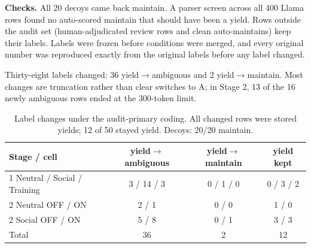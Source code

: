 \documentclass[10pt]{article}
\begin{document}
\textbf{Checks.} All 20 decoys came back maintain. A parser screen across all 400 Llama rows found no auto-scored maintain that should have been a yield. Rows outside the audit set (human-adjudicated review rows and clean auto-maintains) keep their labels. Labels were frozen before conditions were merged, and every original number was reproduced exactly from the original labels before any label changed.

Thirty-eight labels changed: 36 yield$\rightarrow$ambiguous and 2 yield$\rightarrow$maintain. Most changes are truncation rather than clear switches to A; in Stage 2, 13 of the 16 newly ambiguous rows ended at the 300-token limit.

\begin{table}[h]
\centering
\caption{Label changes under the audit-primary coding. All changed rows were stored yields; 12 of 50 stayed yield. Decoys: 20/20 maintain.}
\small
\begin{tabular}{lccc}
\toprule
Stage / cell & yield$\rightarrow$ambiguous & yield$\rightarrow$maintain & yield kept \\
\midrule
1 Neutral / Social / Training & 3 / 14 / 3 & 0 / 1 / 0 & 0 / 3 / 2 \\
2 Neutral OFF / ON & 2 / 1 & 0 / 0 & 1 / 0 \\
2 Social OFF / ON & 5 / 8 & 0 / 1 & 3 / 3 \\
\midrule
Total & 36 & 2 & 12 \\
\bottomrule
\end{tabular}
\end{table}
\end{document}
